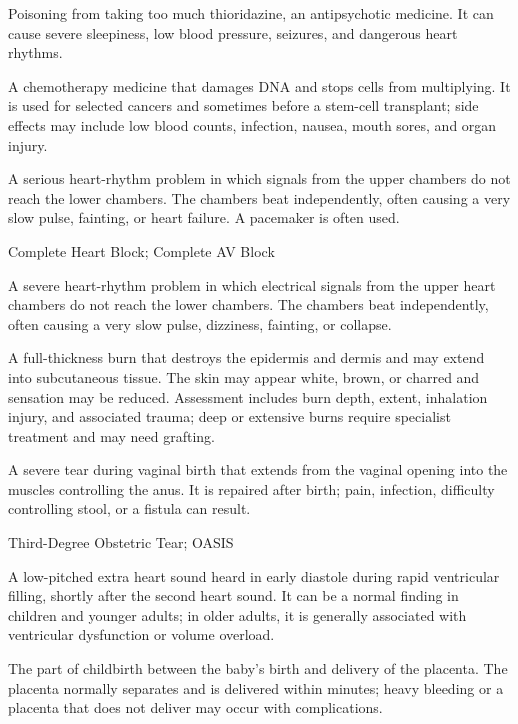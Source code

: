  Poisoning from taking too much thioridazine, an antipsychotic medicine. It can cause severe sleepiness, low blood pressure, seizures, and dangerous heart rhythms.

 A chemotherapy medicine that damages DNA and stops cells from multiplying. It is used for selected cancers and sometimes before a stem-cell transplant; side effects may include low blood counts, infection, nausea, mouth sores, and organ injury.

 A serious heart-rhythm problem in which signals from the upper chambers do not reach the lower chambers. The chambers beat independently, often causing a very slow pulse, fainting, or heart failure. A pacemaker is often used.

\synonyms
Complete Heart Block; Complete AV Block

 A severe heart-rhythm problem in which electrical signals from the upper heart chambers do not reach the lower chambers. The chambers beat independently, often causing a very slow pulse, dizziness, fainting, or collapse.

 A full-thickness burn that destroys the epidermis and dermis and may extend into subcutaneous tissue.
The skin may appear white, brown, or charred and sensation may be reduced. Assessment
includes burn depth, extent, inhalation injury, and associated trauma; deep or extensive
burns require specialist treatment and may need grafting.

 A severe tear during vaginal birth that extends from the vaginal opening into the muscles controlling the anus. It is repaired after birth; pain, infection, difficulty controlling stool, or a fistula can result.

\synonyms
Third-Degree Obstetric Tear; OASIS

 A low-pitched extra heart sound heard in early diastole during rapid ventricular filling, shortly after the second heart sound. It can be a normal finding in children and younger adults; in older adults, it is generally associated with ventricular dysfunction or volume overload.

 The part of childbirth between the baby’s birth and delivery of the placenta. The placenta normally separates and is delivered within minutes; heavy bleeding or a placenta that does not deliver may occur with complications.

